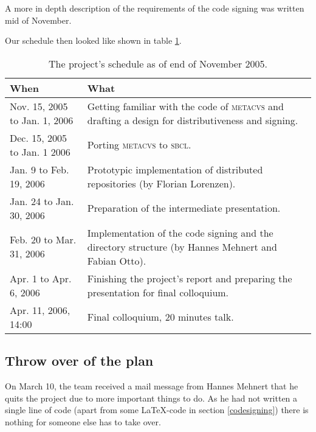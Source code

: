 \documentclass[fleqn, 10pt, a4paper]{report} \usepackage{amssymb}
\begin{document}
A more in depth description of the requirements of the code signing
was written mid of November.

Our schedule then looked like shown in table \ref{schedule}.

\begin{table}
  \begin{center}
    \begin{tabular}{@{}|@{\hspace{0.01\textwidth}}p{}
        @{\hspace{0.01\textwidth}}|@{\hspace{0.01\textwidth}}
        p{}@{\hspace{0.01\textwidth}}|@{}}
      \hline
      \textmd{When} & \textmd{What} \\
      \hline\hline
      Nov. 15, 2005 to Jan. 1, 2006 &
      Getting familiar with the code of \textsc{metacvs}
      and drafting a design for distributiveness and signing. \\
      \hline
      Dec. 15, 2005 to Jan. 1 2006 &
      Porting \textsc{metacvs} to \textsc{sbcl}. \\
      \hline
      Jan. 9 to Feb. 19, 2006 & Prototypic implementation of
      distributed repositories (by Florian Lorenzen). \\
      \hline
      Jan. 24 to Jan. 30, 2006 & Preparation of the intermediate
      presentation. \\
      \hline
      Feb. 20 to Mar. 31, 2006 & Implementation of the code signing
      and the directory structure (by Hannes Mehnert and Fabian Otto). \\
      \hline
      Apr. 1 to Apr. 6, 2006 & Finishing the project's report
      and preparing the presentation for final colloquium. \\
      \hline
      Apr. 11, 2006, 14:00 & Final colloquium, 20 minutes talk. \\
      \hline
    \end{tabular}
  \end{center}
  \caption{The project's schedule as of end of November 2005. \label{schedule}}
\end{table}

\subsection{Throw over of the plan}

On March 10, the team received a mail message from Hannes Mehnert that
he quits the project due to more important things to do. As he had not
written a single line of code (apart from some \LaTeX-code in section
\ref{codesigning}) there is nothing for someone else has to take over.
\end{document}
